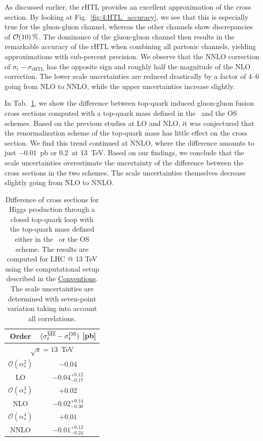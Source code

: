 As discussed earlier, the \acs{rHTL} provides an excellent approximation of the cross section. By looking at Fig.~\ref{fig:4:HTL_accuracy}, we see that this is especially true for the gluon-gluon channel, whereas the other channels show discrepancies of $\mathcal{O}\!\left(10\right)\%$. The dominance of the gluon-gluon channel then results in the remarkable accuracy of the \acs{rHTL} when combining all partonic channels, yielding approximations with sub-percent precision. We observe that the \acs{NNLO} correction of $\sigma_t - \sigma_{\text{rHTL}}$ has the opposite sign and roughly half the magnitude of the \acs{NLO} correction. The lower scale uncertainties are reduced drastically by a factor of 4--6 going from \acs{NLO} to \acs{NNLO}, while the upper uncertainties increase slightly.

In Tab.~\ref{tab:6:topSchemeDifference}, we show the difference between top-quark induced gluon-gluon fusion cross sections computed with a top-quark mass defined in the \MS\ and the \acs{OS} schemes. Based on the previous studies at \acs{LO} and \acs{NLO}, it was conjectured that the renormalization scheme of the top-quark mass has little effect on the cross section. We find this trend continued at \acs{NNLO}, where the difference amounts to just $-0.01$~pb or $0.2$\textperthousand\ at 13~TeV. Based on our findings, we conclude that the scale uncertainties overestimate the uncertainty of the difference between the cross sections in the two schemes. The scale uncertainties themselves decrease slightly going from \acs{NLO} to \acs{NNLO}.
\begin{table}[ht]
  \centering
  \begin{tabular}{cc}
  \hline
      Order & $(\sigma_t^{\overline{\mathrm{MS}}} - \sigma_t^{\mathrm{OS}})$ [pb] \\
  \hline
  \hline
  \multicolumn{2}{c}{$\sqrt{s}=13$~TeV} \\
  \hline
  $\mathcal{O}(\alpha_s^2)$     & $-0.04$ \\
  LO & $-0.04^{+0.12}_{-0.17}$ \\
  \hline
  $\mathcal{O}(\alpha_s^3)$ & $+0.02$ \\
  NLO & $-0.02^{+0.14}_{-0.30}$ \\
  \hline
  $\mathcal{O}(\alpha_s^4)$ & $+0.01$ \\
  NNLO & $-0.01^{+0.12}_{-0.24}$ \\
  \hline
  \end{tabular}
\caption{Difference of cross sections for Higgs production through a closed top-quark loop with the top-quark mass defined either in the \MS\ or the OS scheme. The results are computed for LHC @ 13 TeV using the computational setup described in the \hyperref[chap:notation_and_conventions]{Conventions}. The scale uncertainties are determined with seven-point variation taking into account all correlations.}
\label{tab:6:topSchemeDifference}
\end{table}

